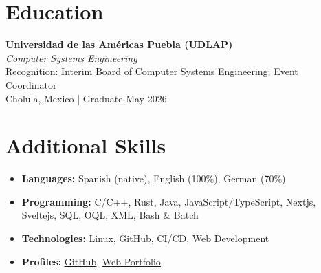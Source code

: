 \documentclass[a4paper,10pt]{article}
\begin{document}
\section*{Education}
\textbf{Universidad de las Américas Puebla (UDLAP)}\\
\textit{Computer Systems Engineering}\\
Recognition: Interim Board of Computer Systems Engineering; Event Coordinator\\
Cholula, Mexico | Graduate May 2026

\section*{Additional Skills}
\begin{itemize}
    \item \textbf{Languages:} Spanish (native), English (100\%), German (70\%)
    \item \textbf{Programming:} C/C++, Rust, Java, JavaScript/TypeScript, Nextjs, Sveltejs, SQL, OQL, XML, Bash \& Batch
    \item \textbf{Technologies:} Linux, GitHub, CI/CD, Web Development
    \item \textbf{Profiles:} \underline{\href{https://github.com/HugeErick}{GitHub}}, \underline{\href{https://portafolio-delta-wheat.vercel.app/}{Web Portfolio}}
\end{itemize}
\end{document}
